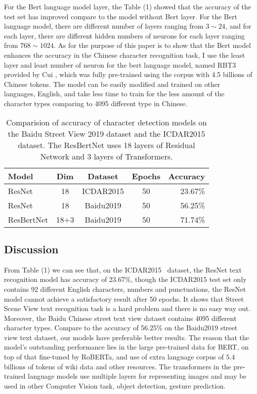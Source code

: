 \documentclass[review]{cvpr}
\begin{document}
For the Bert language model layer, the Table (1) showed that the accuracy of the test set has improved compare to the model without Bert layer.
For the Bert language model, there are different number of layers ranging from $3\sim24$, and for each layer,
there are different hidden numbers of neurons for each layer ranging from $768\sim1024$.
As for the purpose of this paper is to show that the Bert model enhances the accuracy in the Chinese character recognition task,
I use the least layer and least number of neuron for the bert language model, named RBT3 provided by Cui \etal,
which was fully pre-trained using the corpus with 4.5 billions of Chinese tokens.
The model can be easily modified and trained on other languages, \eg English,
and take less time to train for the less amount of the character types comparing to
4095 different type in Chinese.


\begin{table}
\begin{center}
\begin{tabular}{|l|c|c|c|r|}
\hline
Model & Dim & Dataset& Epochs & Accuracy \\
\hline\hline
ResNet      & 18 &  ICDAR2015 &50 &	23.67\% \\
ResNet      & 18 &  Baidu2019	  &50 &	56.25\% \\
ResBertNet  & 18+3 & Baidu2019    & 50	&	71.74\% \\
\hline
\end{tabular}
\end{center}
\caption{Comparision of accuracy of character detection models on the Baidu Street View 2019 dataset and the ICDAR2015 dataset.
The ResBertNet uses 18 layers of Residual Network and 3 layers of Transformers.}
\end{table}


\subsection{Discussion}

From Table (1) we can see that, on the ICDAR2015~\cite{karatzas2015icdar} dataset, the ResNet text recognition model has accuracy of 23.67\%,
though the ICDAR2015 test set only contains 92 different English characters, numbers and punctuations,
the ResNet model cannot achieve a satisfactory result after 50 epochs.
It shows that Street Scene View text recognition task is a hard problem and there is no easy way out.
Moreover, the Baidu Chinese street text view dataset contains 4095 different character types.
Compare to the accuracy of 56.25\% on the Baidu2019 street view text dataset, our models have preferable better results.
The reason that the model's outstanding performance lies in the large pre-trained data for BERT, on top of that fine-tuned by RoBERTa, and use of extra language corpus of
$5.4$ billions of tokens of wiki data and other resources.
The transformers in the pre-trained language models use multiple layers for representing images and may be used in other Computer Vision task, \eg object detection, gesture prediction.
\end{document}
